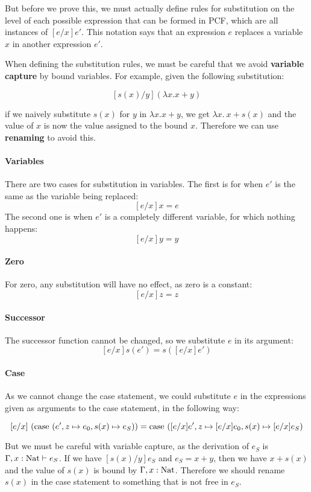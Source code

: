 But before we prove this, we must actually define rules for substitution on the level of each possible expression that can be formed in PCF, which are all instances of $[e/x]e'$. This notation says that an expression $e$ replaces a variable $x$ in another expression $e'$.

When defining the substitution rules, we must be careful  that we avoid \textbf{variable capture} by bound variables. For example, given the following substitution:

\[ [s(x)/y](\lambda x. x + y) \]

if we naively substitute $s(x)$ for $y$ in $\lambda x. x + y$, we get $\lambda x. \ x + s(x)$ and the value of $x$ is now the value assigned to the bound $x$. Therefore we can use \textbf{renaming} to avoid this. 

\paragraph {Variables} There are two cases for substitution in variables. The first is for when $e'$ is the same as the variable being replaced:
\[[e/x]x = e\]
The second one is when $e'$ is a completely different variable, for which nothing happens:
\[ [e/x]y = y\]

\paragraph{Zero} For zero, any substitution will have no effect, as zero is a constant:
\[ [e/x]z = z\]

\paragraph{Successor} The successor function cannot be changed, so we substitute $e$ in its argument:
 \[[e/x]s(e') = s([e/x]e')\]
 
\paragraph{Case} As we cannot change the case statement, we could substitute $e$ in the expressions given as arguments to the case statement, in the following way: 

\[ [e/x] \ (\operatorname{case} \ (e', z \mapsto e_0, s(x) \mapsto e_S)) = \operatorname{case} \ ([e/x]e', z \mapsto [e/x]e_0, s(x)  \mapsto [e/x]e_S)\]

But we must be careful with variable capture, as the derivation of $e_S$ is $\Gamma, x: \operatorname{Nat} \vdash e_S$. If we have $[s(x)/y] e_S$ and $e_S = x + y$, then we have $x + s(x)$ and the value of $s(x)$ is bound by $\Gamma, x : \operatorname{Nat}$. Therefore we should rename $s(x)$ in the case statement to something that is not free in $e_S$.

